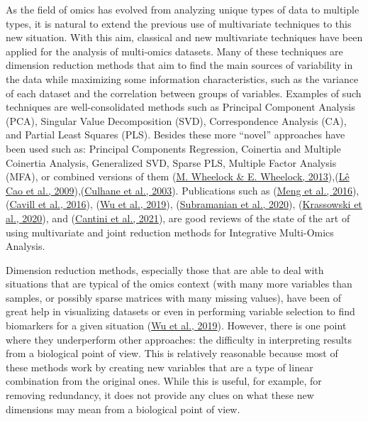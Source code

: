 \documentclass[a4paper, nobind]{templates/ociamthesis}
\begin{document}
As the field of omics has evolved from analyzing unique types of data to multiple types, it is natural to extend the previous use of multivariate techniques to this new situation. With this aim, classical and new multivariate techniques have been applied for the analysis of multi-omics datasets. Many of these techniques are dimension reduction methods that aim to find the main sources of variability in the data while maximizing some information characteristics, such as the variance of each dataset and the correlation between groups of variables. Examples of such techniques are well-consolidated methods such as Principal Component Analysis (PCA), Singular Value Decomposition (SVD), Correspondence Analysis (CA), and Partial Least Squares (PLS). Besides these more ``novel'' approaches have been used such as: Principal Components Regression, Coinertia and Multiple Coinertia Analysis, Generalized SVD, Sparse PLS, Multiple Factor Analysis (MFA), or combined versions of them (\protect\hyperlink{ref-mwheelock_trials_2013}{M. Wheelock \& E. Wheelock, 2013}),(\protect\hyperlink{ref-le_cao_sparse_2009}{Lê Cao et al., 2009}),(\protect\hyperlink{ref-culhane_cross-platform_2003}{Culhane et al., 2003}). Publications such as (\protect\hyperlink{ref-meng_dimension_2016}{Meng et al., 2016}), (\protect\hyperlink{ref-cavill_transcriptomic_2016}{Cavill et al., 2016}), (\protect\hyperlink{ref-wu_selective_2019}{Wu et al., 2019}), (\protect\hyperlink{ref-subramanian_multi-omics_2020}{Subramanian et al., 2020}), (\protect\hyperlink{ref-krassowski_state_2020}{Krassowski et al., 2020}), and (\protect\hyperlink{ref-cantini_benchmarking_2021}{Cantini et al., 2021}), are good reviews of the state of the art of using multivariate and joint reduction methods for Integrative Multi-Omics Analysis.

Dimension reduction methods, especially those that are able to deal with situations that are typical of the omics context (with many more variables than samples, or possibly sparse matrices with many missing values), have been of great help in visualizing datasets or even in performing variable selection to find biomarkers for a given situation (\protect\hyperlink{ref-wu_selective_2019}{Wu et al., 2019}). However, there is one point where they underperform other approaches: the difficulty in interpreting results from a biological point of view. This is relatively reasonable because most of these methods work by creating new variables that are a type of linear combination from the original ones. While this is useful, for example, for removing redundancy, it does not provide any clues on what these new dimensions may mean from a biological point of view.
\end{document}
